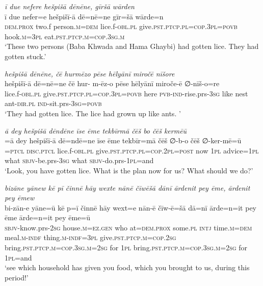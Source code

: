 \ea \label{BP.150}
\textit{ī due nefere hešpišā dēnēne, gīršā wārden} \\ 
\gll ī due nefer=e hešpišī-ā dē=nē=ne gīr=šā wārde=n \\ 
 \textsc{dem.prox} two.f person\textsc{.m}\textsc{=dem} lice.f\textsc{-obl}\textsc{.pl} give\textsc{.pst}\textsc{.ptcp}\textsc{.pl}\textsc{=cop}\textsc{.3pl}\textsc{=\textsc{povb}} hook\textsc{.m}\textsc{=3pl} eat\textsc{.pst}\textsc{.ptcp}\textsc{.m}\textsc{=cop}\textsc{.3sg}\textsc{.m} \\ 
\glt `These two persons (Baba Khwada and Hama Ghaybi) had gotten lice. They had gotten stuck.'
\z 
 
\ea \label{BP.151}
\textit{hešpišā dēnēne, čē hurmēzo pēse hēlyānī miročē nīšore} \\ 
\gll hešpišī-ā dē=nē=ne čē hur- m-ēz-o pēse hēlyānī miroče-ē ∅-nīš-o=re \\ 
 lice.f\textsc{-obl}\textsc{.pl} give\textsc{.pst}\textsc{.ptcp}\textsc{.pl}\textsc{=cop}\textsc{.3pl}\textsc{=\textsc{povb}} here \textsc{pvb-}\textsc{ind-}rise.prs\textsc{-3sg} like nest ant\textsc{-dir}\textsc{.pl} \textsc{ind-}sit.prs\textsc{-3sg}\textsc{=\textsc{povb}} \\ 
\glt `They had gotten lice. The lice had grown up like ants. '
\z 
 
\ea \label{BP.156}
\textit{ā dey hešpišā dēndēne īse ēme tekbīrmā čēš bo čēš kermēū} \\ 
\gll =ā dey hešpišī-ā dē=ndē=ne īse ēme tekbīr=mā čēš ∅-b-o čēš ∅-ker-mē=ū \\ 
=\textsc{ptcl} \textsc{disc.ptcl} lice.f\textsc{-obl}\textsc{.pl} give\textsc{.pst}\textsc{.ptcp}\textsc{.pl}\textsc{=cop}.\textsc{2pl}\textsc{=\textsc{post}} now \textsc{1pl} advice\textsc{=\textsc{1pl}} what \textsc{sbjv-}be.prs\textsc{-3sg} what \textsc{sbjv-}do.prs\textsc{-\textsc{1pl}}=and \\ 
\glt `Look, you have gotten lice. What is the plan now for us? What should we do?'
\z 
 
\ea \label{BP.161}
\textit{bizāne yānew kē pī činnē hāy wexte nānē čīwēšā dānī ārdenit pey ēme, ārdenit pey ēmew} \\ 
\gll bi-zān-e yāne=ū kē p=ī činnē hāy wext=e nān-ē čīw-ē=šā dā=nī ārde=n=it pey ēme ārde=n=it pey ēme=ū \\ 
 \textsc{sbjv-}know.prs-\textsc{2sg} house\textsc{.m}\textsc{=ez.gen} who at=\textsc{dem.prox} some\textsc{.pl} \textsc{intj} time\textsc{.m}\textsc{=dem} meal\textsc{.m}\textsc{-indf} thing\textsc{.m}\textsc{-indf}\textsc{=3pl} give\textsc{.pst}\textsc{.ptcp}\textsc{.m}\textsc{=cop}\textsc{.\textsc{2sg}} bring\textsc{.pst}\textsc{.ptcp}\textsc{.m}\textsc{=cop}\textsc{.3sg}\textsc{.m}\textsc{=\textsc{2sg}} for \textsc{1pl} bring\textsc{.pst}\textsc{.ptcp}\textsc{.m}\textsc{=cop}\textsc{.3sg}\textsc{.m}\textsc{=\textsc{2sg}} for \textsc{1pl}=and \\ 
\glt `see which household has given you food, which you brought to us, during this period!'
\z 
 
